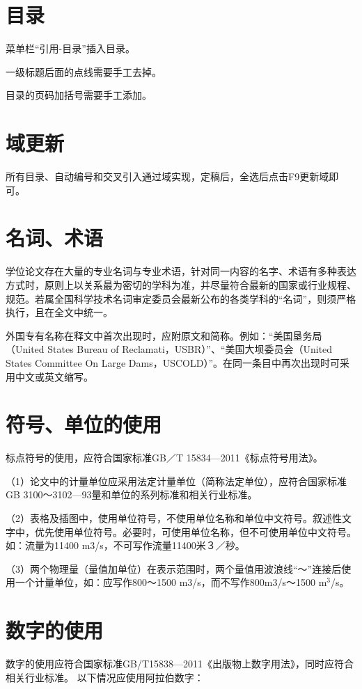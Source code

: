 \section{目录}
菜单栏“引用-目录”插入目录。

一级标题后面的点线需要手工去掉。

目录的页码加括号需要手工添加。

\section{域更新}
所有目录、自动编号和交叉引入通过域实现，定稿后，全选后点击F9更新域即可。

\section{名词、术语}
学位论文存在大量的专业名词与专业术语，针对同一内容的名字、术语有多种表达方式时，原则上以关系最为密切的学科为准，并尽量符合最新的国家或行业规程、规范。若属全国科学技术名词审定委员会最新公布的各类学科的“名词”，则须严格执行，且在全文中统一。

外国专有名称在释文中首次出现时，应附原文和简称。例如：“美国垦务局（United States Bureau of Reclamati，USBR）”、“美国大坝委员会（United States Committee On Large Dams，USCOLD）”。在同一条目中再次出现时可采用中文或英文缩写。

\section{符号、单位的使用}
标点符号的使用，应符合国家标准GB／T 15834—2011《标点符号用法》。

（1）论文中的计量单位应采用法定计量单位（简称法定单位），应符合国家标准GB 3100～3102—93量和单位的系列标准和相关行业标准。

（2）表格及插图中，使用单位符号，不使用单位名称和单位中文符号。叙述性文字中，优先使用单位符号。必要时，可使用单位名称，但不可使用单位中文符号。如：流量为11400 m3/s，不可写作流量11400米３／秒。

（3）两个物理量（量值加单位）在表示范围时，两个量值用波浪线“～”连接后使用一个计量单位，如：应写作800～1500 m3/s，而不写作800m3/s～1500 m$^3$/s。



\section{数字的使用}
数字的使用应符合国家标准GB/T15838—2011《出版物上数字用法》，同时应符合相关行业标准。
以下情况应使用阿拉伯数字：

